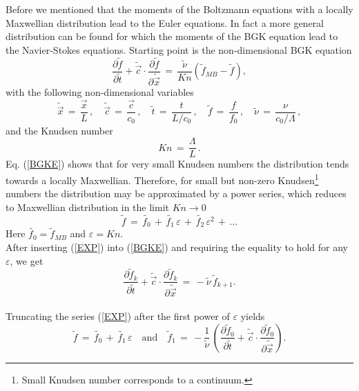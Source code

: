 Before we mentioned that the moments of the Boltzmann equations with a locally Maxwellian distribution lead to the Euler equations. In fact a more general distribution can be found for which the moments of the BGK equation lead to the Navier-Stokes equations. Starting point is the non-dimensional BGK equation
\begin{equation}
  \frac{\partial{\tilde{f}}}{\partial{\tilde{t}}} +  \tilde{\vec c} \cdot  \frac{\partial{\tilde{f}}}{\partial{\tilde{\vec x}}} \,=\, \frac{\tilde{\nu}}{Kn} \left( \tilde{f}_{MB} - \tilde{f} \right),\label{BGKE}
\end{equation}
with the following non-dimensional variables
\begin{equation}
  \tilde{\vec x} \,=\,\frac{\vec x}{L}\,, \quad
  \tilde{\vec c} \,=\,\frac{\vec c}{c_0}\,, \quad
  \tilde{t} \,=\,\frac{t}{L / c_0}\,, \quad
  \tilde{f} \,=\,\frac{f}{ f_0}\,, \quad
  \tilde{\nu} \,=\,\frac{\nu}{c_0 / \Lambda}\,,\nonumber
\end{equation}
and the Knudsen number
\begin{equation}
  Kn \,=\, \frac{\Lambda}{L}\,.\nonumber
\end{equation}
Eq. (\ref{BGKE}) shows that for very small Knudsen numbers the distribution tends towards a locally Maxwellian. Therefore, for small but non-zero Knudsen\footnote{Small Knudsen number corresponds to a continuum.} numbers the distribution may be approximated by a power series, which reduces to Maxwellian distribution in the limit $Kn \rightarrow 0$
\begin{equation}
  \tilde{f} \,=\, \tilde{f_0}\,+\, \tilde{f_1} \, \varepsilon \,+\, \tilde{f_2} \, \varepsilon^2 \,+\, ...\label{EXP}
\end{equation}
Here $\tilde{f_0} = \tilde{f}_{MB} $ and $ \varepsilon = Kn$.\\[1ex]
After inserting (\ref{EXP}) into (\ref{BGKE}) and requiring the equality to hold for any $ \varepsilon $, we get
\begin{equation}
  \frac{\partial{\tilde{f}_k}}{\partial{\tilde{t}}} +  \tilde{\vec c} \cdot  \frac{\partial{\tilde{f}_k}}{\partial{\tilde{\vec x}}} \,=\, -\tilde{\nu} \, \tilde{f}_{k+1}.\nonumber
\end{equation}\\[2ex]
Truncating the series (\ref{EXP}) after the first power of $ \varepsilon $ yields
\begin{equation}
  \tilde{f} \,=\, \tilde{f_0}\,+\, \tilde{f_1} \, \varepsilon \quad \mbox{and} \quad \tilde{f}_1 \,=\, - \frac{1}{\tilde{\nu}} \, \left( \frac{\partial{\tilde{f}_0}}{\partial{\tilde{t}}} +  \tilde{\vec c} \cdot  \frac{\partial{\tilde{f}_0}}{\partial{\tilde{\vec x}}} \right) .\nonumber
\end{equation}
